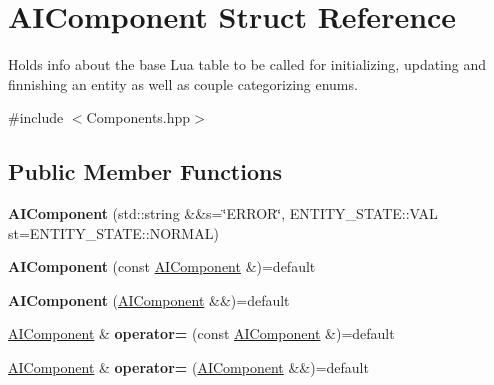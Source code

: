 \hypertarget{struct_a_i_component}{}\section{A\+I\+Component Struct Reference}
\label{struct_a_i_component}


Holds info about the base Lua table to be called for initializing, updating and finnishing an entity as well as couple categorizing enums.  




{\ttfamily \#include $<$Components.\+hpp$>$}

\subsection*{Public Member Functions}
\begin{DoxyCompactItemize}
\item 
{\bfseries A\+I\+Component} (std\+::string \&\&s=\char`\"{}E\+R\+R\+OR\char`\"{}, E\+N\+T\+I\+T\+Y\+\_\+\+S\+T\+A\+T\+E\+::\+V\+AL st=E\+N\+T\+I\+T\+Y\+\_\+\+S\+T\+A\+T\+E\+::\+N\+O\+R\+M\+AL)\hypertarget{struct_a_i_component_a2f77434572786627016d1a679b297a41}{}\label{struct_a_i_component_a2f77434572786627016d1a679b297a41}

\item 
{\bfseries A\+I\+Component} (const \hyperlink{struct_a_i_component}{A\+I\+Component} \&)=default\hypertarget{struct_a_i_component_a88708afa9f338f1ff8676da511c75bea}{}\label{struct_a_i_component_a88708afa9f338f1ff8676da511c75bea}

\item 
{\bfseries A\+I\+Component} (\hyperlink{struct_a_i_component}{A\+I\+Component} \&\&)=default\hypertarget{struct_a_i_component_a6f8e48466d4cf9883c8beb6057834790}{}\label{struct_a_i_component_a6f8e48466d4cf9883c8beb6057834790}

\item 
\hyperlink{struct_a_i_component}{A\+I\+Component} \& {\bfseries operator=} (const \hyperlink{struct_a_i_component}{A\+I\+Component} \&)=default\hypertarget{struct_a_i_component_a73da37b86ffc1e8785241bb813b7b641}{}\label{struct_a_i_component_a73da37b86ffc1e8785241bb813b7b641}

\item 
\hyperlink{struct_a_i_component}{A\+I\+Component} \& {\bfseries operator=} (\hyperlink{struct_a_i_component}{A\+I\+Component} \&\&)=default\hypertarget{struct_a_i_component_a0fa698bb50abc2c62cc93a7774650412}{}\label{struct_a_i_component_a0fa698bb50abc2c62cc93a7774650412}

\end{DoxyCompactItemize}

